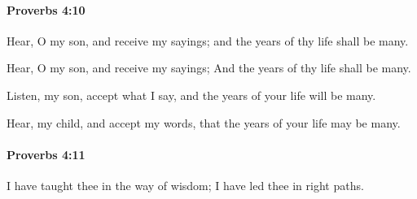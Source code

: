 		\paragraph{Proverbs 4:10} %
			\label{PROVERBS-4-10}

			Hear, O my son, and receive my sayings; and the years of thy life shall be many.

			\begin{versebox}
					\item[BHS] 
					\item[ASV] Hear, O my son, and receive my sayings; And the years of thy life shall be many.
					\item[NIV] Listen, my son, accept what I say, and the years of your life will be many.
					\item[NRSV] Hear, my child, and accept my words, that the years of your life may be many.
			\end{versebox}

		\paragraph{Proverbs 4:11} %
			\label{PROVERBS-4-11}

			I have taught thee in the way of wisdom; I have led thee in right paths.

